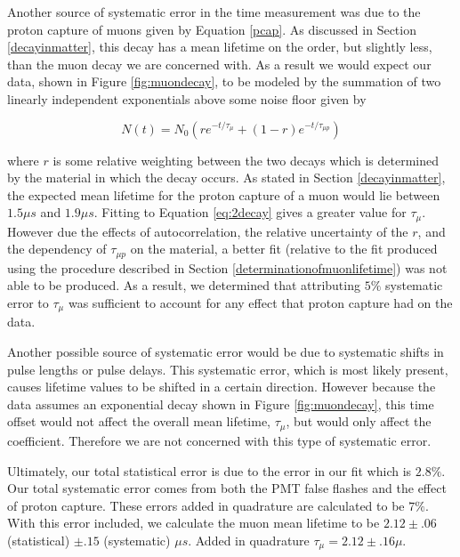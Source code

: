 Another source of systematic error in the time measurement was due to the proton capture of muons given by Equation \eqref{pcap}.  As discussed in Section \ref{decayinmatter}, this decay has a mean lifetime on the order, but slightly less, than the muon decay we are concerned with.  As a result we would expect our data, shown in Figure \ref{fig:muondecay}, to be modeled by the summation of two linearly independent exponentials above some noise floor given by

\begin{center}
\begin{equation}
\label{eq:2decay}
N(t)=N_{0}(r e^{-t/\tau_{\mu}}+(1-r)e^{-t/\tau_{\mu p}})
\end{equation}
\end{center}

where $r$ is some relative weighting between the two decays which is determined by the material in which the decay occurs.  As stated in Section \ref{decayinmatter}, the expected mean lifetime for the proton capture of a muon would lie between $1.5 \mu s$ and $1.9 \mu s$.  Fitting to Equation \eqref{eq:2decay} gives a greater value for $\tau_{\mu}$.  However due the effects of autocorrelation, the relative uncertainty of the $r$, and the dependency of $\tau_{\mu p}$ on the material, a better fit (relative to the fit produced using the procedure described in Section \ref{determinationofmuonlifetime}) was not able to be produced.  As a result, we determined that attributing $5\%$ systematic error to $\tau_{\mu}$ was sufficient to account for any effect that proton capture had on the data. 

Another possible source of systematic error would be due to systematic shifts in pulse lengths or pulse delays.  This systematic error, which is most likely present, causes lifetime values to be shifted in a certain direction.  However because the data assumes an exponential decay shown in Figure \ref{fig:muondecay}, this time offset would not affect the overall mean lifetime, $\tau_{\mu}$, but would only affect the coefficient.  Therefore we are not concerned with this type of systematic error.

Ultimately, our total statistical error is due to the error in our fit which is $2.8\%$.  Our total systematic error comes from both the PMT false flashes and the effect of proton capture.  These errors added in quadrature are calculated to be $7\%$.  With this error included, we calculate the muon mean lifetime to be $2.12\pm.06$ (statistical) $\pm.15$ (systematic) $\mu s$.  Added in quadrature $\tau_{\mu}=2.12\pm.16\mu$.
